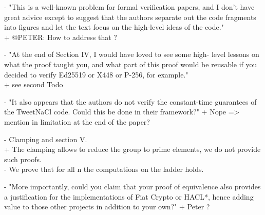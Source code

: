 {- "This is a well-known problem for formal
verification papers, and I don’t have great advice except to suggest
that the authors separate out the code fragments into figures and
let the text focus on the high-level ideas of the code."\\
+ @PETER: How to address that ?

- "At the end of Section IV, I would have loved to see some high-
level lessons on what the proof taught you, and what part of this
proof would be reusable if you decided to verify Ed25519 or X448
or P-256, for example."\\
+ see second Todo

- "It also appears that the authors do not verify the constant-time
guarantees of the TweetNaCl code. Could this be done in their
framework?"
+ Nope => mention in limitation at the end of the paper?

- Clamping and section V.\\
+ The clamping allows to reduce the group to prime elements, we do not provide
such proofs.\\
- We prove that for all n the computations on the ladder holds.

- "More importantly, could you claim that your proof of equivalence also provides
a justification for the implementations of Fiat Crypto or HACL*, hence adding
value to those other projects in addition to your own?"
+ Peter ?
}
